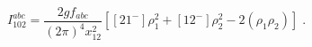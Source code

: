 \begin{equation}\label{defi12}
  I_{102}^{abc} =  \frac{2gf_{abc}}{(2\pi)^4 x_{12}^2}
\left[[21^-]\rho_1^2+[12^-]\rho_2^2 -2(\rho_1\rho_2)\right]\;.
\end{equation} 

